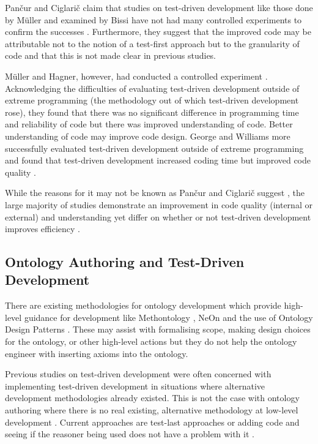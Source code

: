 \documentclass[draft]{sig-alternate-05-2015}
\begin{document}
Pan\v{c}ur and Ciglari\v{c} claim that studies on test-driven development like those done by M\"{u}ller and examined by Bissi have not had many controlled experiments to confirm the successes \cite{DBLP:journals/infsof/PancurC11}. Furthermore, they suggest that the improved code may be attributable not to the notion of a test-first approach but to the granularity of code and that this is not made clear in previous studies.

 M\"{u}ller and Hagner, however, had conducted a controlled experiment \cite{DBLP:journals/iee/MullerH02}. Acknowledging the difficulties of evaluating test-driven development outside of extreme programming (the methodology out of which test-driven development rose), they found that there was no significant difference in programming time and reliability of code but there was improved understanding of code. Better understanding of code may improve code design. George and Williams more successfully evaluated test-driven development outside of extreme programming and found that test-driven development increased coding time but improved code quality \cite{DBLP:journals/infsof/GeorgeW04}.
 
 While the reasons for it may not be known as Pan\v{c}ur and Ciglari\v{c} suggest \cite{DBLP:journals/infsof/PancurC11}, the large majority of studies demonstrate an improvement in code quality (internal or external) \cite{DBLP:journals/infsof/BissiNE16} and understanding yet differ on whether or not test-driven development improves efficiency \cite{DBLP:journals/infsof/GeorgeW04,DBLP:journals/iee/MullerH02}.

\subsection{Ontology Authoring and Test-Driven Development}

There are existing methodologies for ontology development which provide high-level guidance for development like Methontology \cite{fernandez1997methontology}, NeOn \cite{DBLP:journals/ao/Suarez-Figueroa15} and the use of Ontology Design Patterns \cite{DBLP:conf/semweb/PresuttiDGB09}. These may assist with formalising scope, making design choices for the ontology, or other high-level actions but they do not help the ontology engineer with inserting axioms into the ontology.

Previous studies on test-driven development were often concerned with implementing test-driven development in situations where alternative development methodologies already existed. This is not the case with ontology authoring where there is no real existing, alternative methodology at low-level development \cite{DBLP:journals/corr/KeetL15}. Current approaches are test-last approaches or adding code and seeing if the reasoner being used does not have a problem with it \cite{DBLP:conf/esws/KeetL16}.
\end{document}
